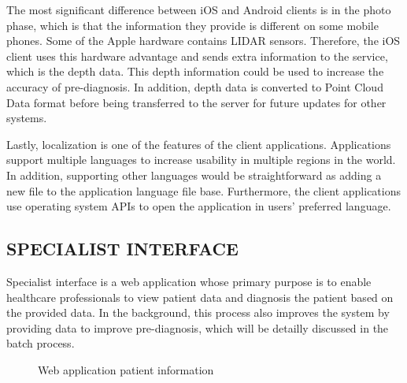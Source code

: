 The most significant difference between iOS and Android clients is in the photo phase, which is that the information they provide is different on some mobile phones. Some of the Apple hardware contains LIDAR sensors. Therefore, the iOS client uses this hardware advantage and sends extra information to the service, which is the depth data. This depth information could be used to increase the accuracy of pre-diagnosis. In addition, depth data is converted to Point Cloud Data format before being transferred to the server for future updates for other systems.

Lastly, localization is one of the features of the client applications. Applications support multiple languages to increase usability in multiple regions in the world. In addition, supporting other languages would be straightforward as adding a new file to the application language file base. Furthermore, the client applications use operating system APIs to open the application in users' preferred language.

\subsection{SPECIALIST INTERFACE} \label{sec:SpecialistInterface}

Specialist interface is a web application whose primary purpose is to enable healthcare professionals to view patient data and diagnosis the patient based on the provided data. In the background, this process also improves the system by providing data to improve pre-diagnosis, which will be detailly discussed in the batch process. 

\begin{figure}[htbp]
\centering
{}
\caption{Web application patient information}
\label{fig:WebApplicationPatientInfo}
\end{figure}

